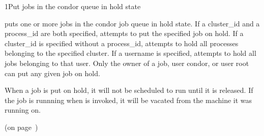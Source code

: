 \begin{ManPage}{}{1}{Put jobs in the condor queue in hold state}
\label{man-condor-hold}
\Synopsis {}

\Description

 puts one or more jobs in the condor job queue in hold state.  If a
cluster\_id and a process\_id are both specified,  attempts to
put the specified job on hold. If a cluster\_id is specified
without a process\_id,  attempts to hold all processes belonging
to the specified cluster. If a username is specified,  attempts to
hold all jobs belonging to that user. Only the owner of a job, user condor,
or user root can put any given job on hold.

When a job is put on hold, it will not be scheduled to run until it is released.
If the job is runnning when  is invoked, it will be vacated from the
machine it was running on.

\begin{Options}
\end{Options}

\SeeAlso
{} (on page~\pageref{man-condor-release})

\end{ManPage}
